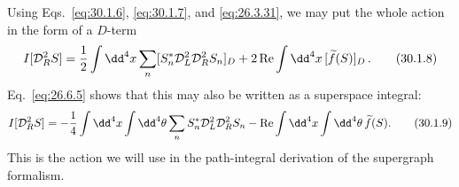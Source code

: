 Using Eqs.~\eqref{eq:30.1.6}, \eqref{eq:30.1.7}, and
\eqref{eq:26.3.31}, we may put the whole action in the form of a \(D\)-term
\begin{equation}
  I[\SuperD_R^2S]
  =\frac12\int \dd^4x\sum_n
    [S_n^*\SuperD_L^2\SuperD_R^2S_n]_D
   +2\operatorname{Re}\int \dd^4x\,[\widetilde f(S)]_D\,.
  \tag{30.1.8}\label{eq:30.1.8}
\end{equation}
Eq.~\eqref{eq:26.6.5} shows that this may also be written as a superspace
integral:
\begin{equation}
  I[\SuperD_R^2S]
  =-\frac14\int \dd^4x\int \dd^4\theta
    \sum_nS_n^*\SuperD_L^2\SuperD_R^2S_n
   -\operatorname{Re}\int \dd^4x\int \dd^4\theta\,\widetilde f(S).
  \tag{30.1.9}\label{eq:30.1.9}
\end{equation}
This is the action we will use in the path-integral derivation of the
supergraph formalism.

